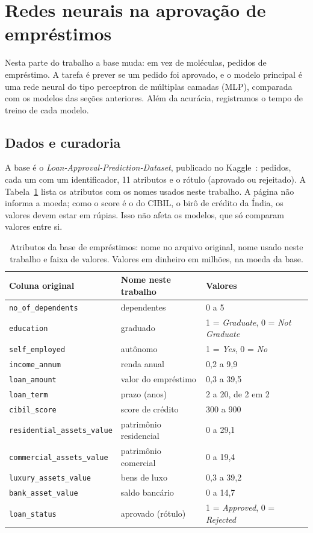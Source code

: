 \section{Redes neurais na aprovação de empréstimos}\label{sec:rn}

Nesta parte do trabalho a base muda: em vez de moléculas, pedidos de empréstimo. A tarefa é prever se um pedido foi aprovado, e o modelo principal é uma rede neural do tipo perceptron de múltiplas camadas (MLP), comparada com os modelos das seções anteriores. Além da acurácia, registramos o tempo de treino de cada modelo.

\subsection{Dados e curadoria}

A base é o \emph{Loan-Approval-Prediction-Dataset}, publicado no Kaggle~\cite{kaggle:loan}: \rnLinhas{} pedidos, cada um com um identificador, 11 atributos e o rótulo (aprovado ou rejeitado). A Tabela~\ref{tab:rn_atributos} lista os atributos com os nomes usados neste trabalho. A página não informa a moeda; como o score é o do CIBIL, o birô de crédito da Índia, os valores devem estar em rúpias. Isso não afeta os modelos, que só comparam valores entre si.

\begin{table}[ht]
\centering
\caption{Atributos da base de empréstimos: nome no arquivo original, nome usado neste trabalho e faixa de valores. Valores em dinheiro em milhões, na moeda da base.}
\label{tab:rn_atributos}
\footnotesize
\begin{tabular}{lll}
\toprule
Coluna original & Nome neste trabalho & Valores \\
\midrule
\texttt{no\_of\_dependents} & dependentes & 0 a 5 \\
\texttt{education} & graduado & 1 = \emph{Graduate}, 0 = \emph{Not Graduate} \\
\texttt{self\_employed} & autônomo & 1 = \emph{Yes}, 0 = \emph{No} \\
\texttt{income\_annum} & renda anual & 0,2 a 9,9 \\
\texttt{loan\_amount} & valor do empréstimo & 0,3 a 39,5 \\
\texttt{loan\_term} & prazo (anos) & 2 a 20, de 2 em 2 \\
\texttt{cibil\_score} & score de crédito & 300 a 900 \\
\texttt{residential\_assets\_value} & patrimônio residencial & 0 a 29,1 \\
\texttt{commercial\_assets\_value} & patrimônio comercial & 0 a 19,4 \\
\texttt{luxury\_assets\_value} & bens de luxo & 0,3 a 39,2 \\
\texttt{bank\_asset\_value} & saldo bancário & 0 a 14,7 \\
\texttt{loan\_status} & aprovado (rótulo) & 1 = \emph{Approved}, 0 = \emph{Rejected} \\
\bottomrule
\end{tabular}
\end{table}

